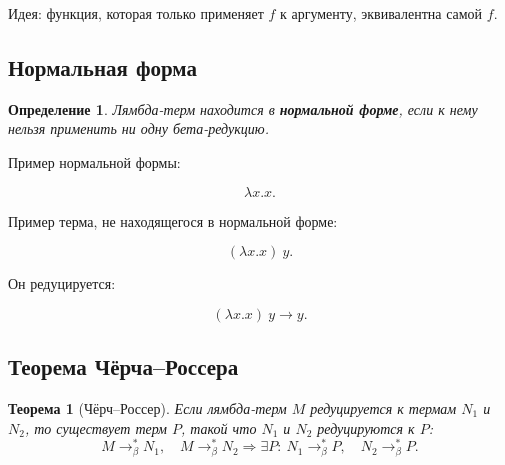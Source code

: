 \documentclass[12pt,a4paper]{article}
\newtheorem{definition}{Определение}
\newtheorem{theorem}{Теорема}
\begin{document}
Идея: функция, которая только применяет $f$ к аргументу, эквивалентна самой $f$.

\subsection{Нормальная форма}

\begin{definition}
Лямбда-терм находится в \textbf{нормальной форме}, если к нему нельзя применить ни одну бета-редукцию.
\end{definition}

Пример нормальной формы:

\[
\lambda x. x.
\]

Пример терма, не находящегося в нормальной форме:

\[
(\lambda x. x)\ y.
\]

Он редуцируется:

\[
(\lambda x. x)\ y \to y.
\]

\subsection{Теорема Чёрча--Россера}

\begin{theorem}[Чёрч--Россер]
Если лямбда-терм $M$ редуцируется к термам $N_1$ и $N_2$, то существует терм $P$, такой что $N_1$ и $N_2$ редуцируются к $P$:
\[
M \to_\beta^* N_1,\quad M \to_\beta^* N_2
\Rightarrow
\exists P:\ N_1 \to_\beta^* P,\quad N_2 \to_\beta^* P.
\]
\end{theorem}
\end{document}
